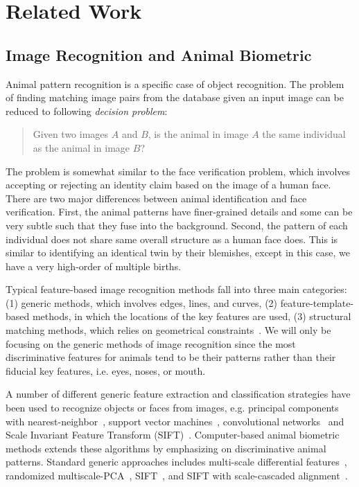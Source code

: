 \graphicspath{{images/chap2/}}
\chapter{Related Work} %
\label{cha:related_work}

\section{Image Recognition and Animal Biometric} %
\label{sec:image_recognition}

Animal pattern recognition is a specific case of object recognition.
The problem of finding matching image pairs from the database given an input
image can be reduced to following \emph{decision problem}:
\begin{quote}
\centering
Given two images $A$ and $B$, is the animal in image $A$ the same
individual as the animal in image $B$?
\end{quote}

The problem is somewhat similar to the face verification problem, which involves
accepting or rejecting an identity claim based on the image of a human face.
There are two major differences between animal identification and face
verification. First, the animal patterns have finer-grained details and some can
be very subtle such that they fuse into the background. Second, the pattern of
each individual does not share same overall structure as a human face does. This
is similar to identifying an identical twin by their blemishes, except in this
case, we have a very high-order of multiple births.

Typical feature-based image recognition methods fall into three main categories:
(1) generic methods, which involves edges, lines, and curves, (2)
feature-template-based methods, in which the locations of the key features are
used, (3) structural matching methods, which relies on geometrical
constraints~\cite{facesurvey03}.  We will only be focusing on the generic
methods of image recognition since the most discriminative features for animals
tend to be their patterns rather than their fiducial key features, i.e. eyes,
noses, or mouth.

A number of different generic feature extraction and classification strategies
have been used to recognize objects or faces from images, e.g. principal
components with nearest-neighbor~\cite{object91,object95,shape00}, support
vector machines~\cite{object97}, convolutional networks~\cite{object98} and
Scale Invariant Feature Transform (SIFT)~\cite{lowe04}. Computer-based animal
biometric methods extends these algorithms by emphasizing on discriminative
animal patterns. Standard generic approaches includes multi-scale differential
features~\cite{gamble08,ravela02,sloop13}, randomized
multiscale-PCA~\cite{ravela04}, SIFT~\cite{town13,sloop13}, and SIFT with
scale-cascaded alignment~\cite{yang09}.

